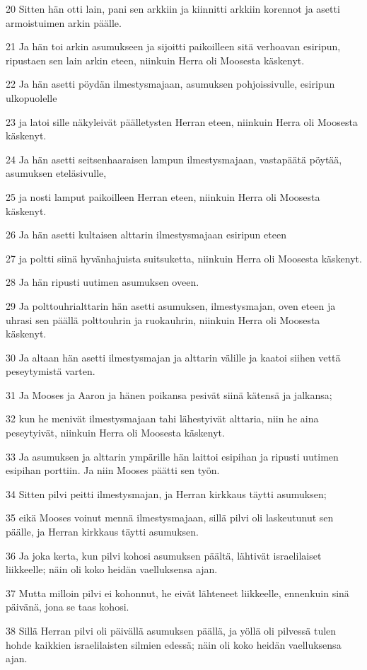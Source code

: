\par 20 Sitten hän otti lain, pani sen arkkiin ja kiinnitti arkkiin korennot ja asetti armoistuimen arkin päälle.
\par 21 Ja hän toi arkin asumukseen ja sijoitti paikoilleen sitä verhoavan esiripun, ripustaen sen lain arkin eteen, niinkuin Herra oli Moosesta käskenyt.
\par 22 Ja hän asetti pöydän ilmestysmajaan, asumuksen pohjoissivulle, esiripun ulkopuolelle
\par 23 ja latoi sille näkyleivät päälletysten Herran eteen, niinkuin Herra oli Moosesta käskenyt.
\par 24 Ja hän asetti seitsenhaaraisen lampun ilmestysmajaan, vastapäätä pöytää, asumuksen eteläsivulle,
\par 25 ja nosti lamput paikoilleen Herran eteen, niinkuin Herra oli Moosesta käskenyt.
\par 26 Ja hän asetti kultaisen alttarin ilmestysmajaan esiripun eteen
\par 27 ja poltti siinä hyvänhajuista suitsuketta, niinkuin Herra oli Moosesta käskenyt.
\par 28 Ja hän ripusti uutimen asumuksen oveen.
\par 29 Ja polttouhrialttarin hän asetti asumuksen, ilmestysmajan, oven eteen ja uhrasi sen päällä polttouhrin ja ruokauhrin, niinkuin Herra oli Moosesta käskenyt.
\par 30 Ja altaan hän asetti ilmestysmajan ja alttarin välille ja kaatoi siihen vettä peseytymistä varten.
\par 31 Ja Mooses ja Aaron ja hänen poikansa pesivät siinä kätensä ja jalkansa;
\par 32 kun he menivät ilmestysmajaan tahi lähestyivät alttaria, niin he aina peseytyivät, niinkuin Herra oli Moosesta käskenyt.
\par 33 Ja asumuksen ja alttarin ympärille hän laittoi esipihan ja ripusti uutimen esipihan porttiin. Ja niin Mooses päätti sen työn.
\par 34 Sitten pilvi peitti ilmestysmajan, ja Herran kirkkaus täytti asumuksen;
\par 35 eikä Mooses voinut mennä ilmestysmajaan, sillä pilvi oli laskeutunut sen päälle, ja Herran kirkkaus täytti asumuksen.
\par 36 Ja joka kerta, kun pilvi kohosi asumuksen päältä, lähtivät israelilaiset liikkeelle; näin oli koko heidän vaelluksensa ajan.
\par 37 Mutta milloin pilvi ei kohonnut, he eivät lähteneet liikkeelle, ennenkuin sinä päivänä, jona se taas kohosi.
\par 38 Sillä Herran pilvi oli päivällä asumuksen päällä, ja yöllä oli pilvessä tulen hohde kaikkien israelilaisten silmien edessä; näin oli koko heidän vaelluksensa ajan.


